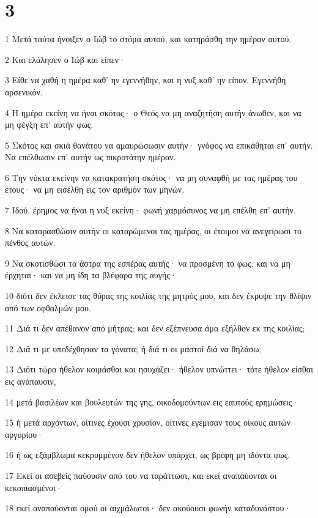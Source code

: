 \chapter{3}

\par 1 Μετά ταύτα ήνοιξεν ο Ιώβ το στόμα αυτού, και κατηράσθη την ημέραν αυτού.
\par 2 Και ελάλησεν ο Ιώβ και είπεν·
\par 3 Είθε να χαθή η ημέρα καθ' ην εγεννήθην, και η νυξ καθ' ην είπον, Εγεννήθη αρσενικόν.
\par 4 Η ημέρα εκείνη να ήναι σκότος· ο Θεός να μη αναζητήση αυτήν άνωθεν, και να μη φέγξη επ' αυτήν φως.
\par 5 Σκότος και σκιά θανάτου να αμαυρώσωσιν αυτήν· γνόφος να επικάθηται επ' αυτήν. Να επέλθωσιν επ' αυτήν ως πικροτάτην ημέραν.
\par 6 Την νύκτα εκείνην να κατακρατήση σκότος· να μη συναφθή με τας ημέρας του έτους· να μη εισέλθη εις τον αριθμόν των μηνών.
\par 7 Ιδού, έρημος να ήναι η νυξ εκείνη· φωνή χαρμόσυνος να μη επέλθη επ' αυτήν.
\par 8 Να καταρασθώσιν αυτήν οι καταρώμενοι τας ημέρας, οι έτοιμοι να ανεγείρωσι το πένθος αυτών.
\par 9 Να σκοτισθώσι τα άστρα της εσπέρας αυτής· να προσμένη το φως, και να μη έρχηται· και να μη ίδη τα βλέφαρα της αυγής·
\par 10 διότι δεν έκλεισε τας θύρας της κοιλίας της μητρός μου, και δεν έκρυψε την θλίψιν από των οφθαλμών μου.
\par 11 Διά τι δεν απέθανον από μήτρας; και δεν εξέπνευσα άμα εξήλθον εκ της κοιλίας;
\par 12 Διά τι με υπεδέχθησαν τα γόνατα; ή διά τι οι μαστοί διά να θηλάσω;
\par 13 Διότι τώρα ήθελον κοιμάσθαι και ησυχάζει· ήθελον υπνώττει· τότε ήθελον είσθαι εις ανάπαυσιν,
\par 14 μετά βασιλέων και βουλευτών της γης, οικοδομούντων εις εαυτούς ερημώσεις·
\par 15 ή μετά αρχόντων, οίτινες έχουσι χρυσίον, οίτινες εγέμισαν τους οίκους αυτών αργυρίου·
\par 16 ή ως εξάμβλωμα κεκρυμμένον δεν ήθελον υπάρχει, ως βρέφη μη ιδόντα φως.
\par 17 Εκεί οι ασεβείς παύουσιν από του να ταράττωσι, και εκεί αναπαύονται οι κεκοπιασμένοι·
\par 18 εκεί αναπαύονται ομού οι αιχμάλωτοι· δεν ακούουσι φωνήν καταδυνάστου·

